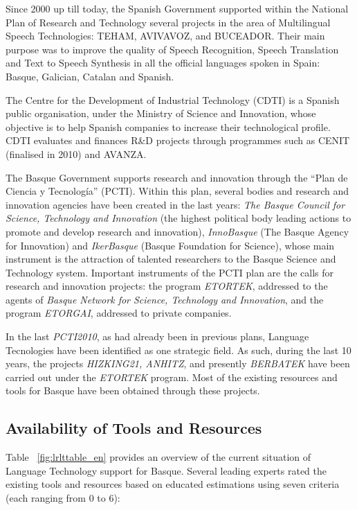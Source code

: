 \begin{multicols}{2}
Since 2000 up till today, the Spanish Government supported within the National Plan of Research and Technology several projects in the area of Multilingual Speech Technologies: TEHAM, AVIVAVOZ, and BUCEADOR. Their main purpose was to improve the quality of Speech Recognition, Speech Translation and Text to Speech Synthesis in all the official languages spoken in Spain: Basque, Galician, Catalan and Spanish.

The Centre for the Development of Industrial Technology (CDTI) is a Spanish public organisation, under the Ministry of Science and Innovation, whose objective is to help Spanish companies to increase their technological profile. CDTI evaluates and finances R\&D projects through programmes such as CENIT (finalised in 2010) and AVANZA.

The Basque Government supports research and innovation through the “Plan de Ciencia y Tecnología” (PCTI). Within this plan, several bodies and research and innovation agencies have been created in the last years: \textit{The Basque Council for Science, Technology and Innovation} (the highest political body leading actions to promote and develop research and innovation), \textit{InnoBasque} (The Basque Agency for Innovation) and \textit{IkerBasque} (Basque Foundation for Science), whose main instrument is the attraction of talented researchers to the Basque Science and Technology system.  Important instruments of the PCTI plan are the calls for research and innovation projects: the program \textit{ETORTEK}, addressed to the agents of\textit{ Basque Network for Science, Technology and Innovation}, and the program \textit{ETORGAI}, addressed to private companies. 

In the last \textit{PCTI2010}, as had already been in previous plans, Language Tecnologies have been identified as one strategic field. As such, during the last 10 years, the projects \textit{HIZKING21, ANHITZ}, and presently \textit{BERBATEK} \cite{BAS-Nota37}  have been carried out under the \textit{ETORTEK} program. Most of the existing resources and tools for Basque have been obtained through these projects.
  
\subsection{Availability of Tools and Resources}

    Table ~\ref{fig:lrlttable_en} provides an overview of the current situation of Language Technology support for Basque. Several leading experts rated the existing tools and resources based on educated estimations using seven criteria (each ranging from 0 to 6):


\end{multicols}
